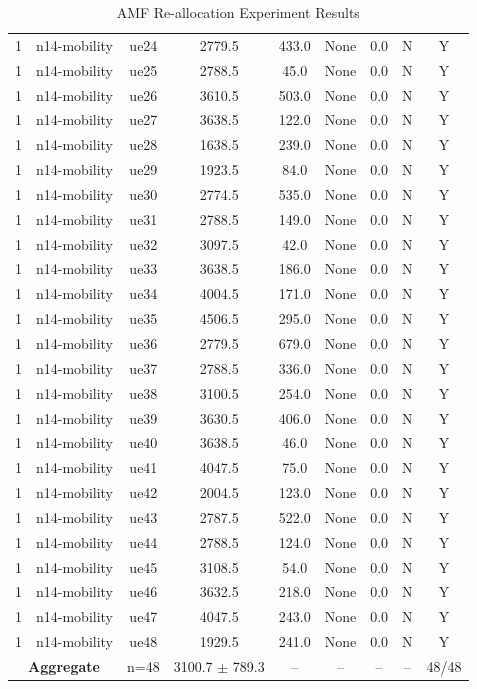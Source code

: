 \begin{table}[ht]
\begin{tabular}{|c|c|c|c|c|c|c|c|c|}
1 & n14-mobility & ue24 & 2779.5 & 433.0 & None & 0.0 & N & Y \\
1 & n14-mobility & ue25 & 2788.5 & 45.0 & None & 0.0 & N & Y \\
1 & n14-mobility & ue26 & 3610.5 & 503.0 & None & 0.0 & N & Y \\
1 & n14-mobility & ue27 & 3638.5 & 122.0 & None & 0.0 & N & Y \\
1 & n14-mobility & ue28 & 1638.5 & 239.0 & None & 0.0 & N & Y \\
1 & n14-mobility & ue29 & 1923.5 & 84.0 & None & 0.0 & N & Y \\
1 & n14-mobility & ue30 & 2774.5 & 535.0 & None & 0.0 & N & Y \\
1 & n14-mobility & ue31 & 2788.5 & 149.0 & None & 0.0 & N & Y \\
1 & n14-mobility & ue32 & 3097.5 & 42.0 & None & 0.0 & N & Y \\
1 & n14-mobility & ue33 & 3638.5 & 186.0 & None & 0.0 & N & Y \\
1 & n14-mobility & ue34 & 4004.5 & 171.0 & None & 0.0 & N & Y \\
1 & n14-mobility & ue35 & 4506.5 & 295.0 & None & 0.0 & N & Y \\
1 & n14-mobility & ue36 & 2779.5 & 679.0 & None & 0.0 & N & Y \\
1 & n14-mobility & ue37 & 2788.5 & 336.0 & None & 0.0 & N & Y \\
1 & n14-mobility & ue38 & 3100.5 & 254.0 & None & 0.0 & N & Y \\
1 & n14-mobility & ue39 & 3630.5 & 406.0 & None & 0.0 & N & Y \\
1 & n14-mobility & ue40 & 3638.5 & 46.0 & None & 0.0 & N & Y \\
1 & n14-mobility & ue41 & 4047.5 & 75.0 & None & 0.0 & N & Y \\
1 & n14-mobility & ue42 & 2004.5 & 123.0 & None & 0.0 & N & Y \\
1 & n14-mobility & ue43 & 2787.5 & 522.0 & None & 0.0 & N & Y \\
1 & n14-mobility & ue44 & 2788.5 & 124.0 & None & 0.0 & N & Y \\
1 & n14-mobility & ue45 & 3108.5 & 54.0 & None & 0.0 & N & Y \\
1 & n14-mobility & ue46 & 3632.5 & 218.0 & None & 0.0 & N & Y \\
1 & n14-mobility & ue47 & 4047.5 & 243.0 & None & 0.0 & N & Y \\
1 & n14-mobility & ue48 & 1929.5 & 241.0 & None & 0.0 & N & Y \\
\multicolumn{2}{|c|}{\textbf{Aggregate}} & n=48 & 3100.7 $\pm$ 789.3 & -- & -- & -- & -- & 48/48 \\
\hline
\end{tabular}
\caption{AMF Re-allocation Experiment Results}
\label{tab:amf_realloc}
\end{table}
